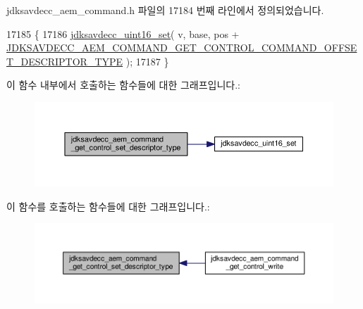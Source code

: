 jdksavdecc\+\_\+aem\+\_\+command.\+h 파일의 17184 번째 라인에서 정의되었습니다.


\begin{DoxyCode}
17185 \{
17186     \hyperlink{group__endian_ga14b9eeadc05f94334096c127c955a60b}{jdksavdecc\_uint16\_set}( v, base, pos + 
      \hyperlink{group__command__get__control_gab6f8d9ccbc87bb8a57077d41cd8fe7a2}{JDKSAVDECC\_AEM\_COMMAND\_GET\_CONTROL\_COMMAND\_OFFSET\_DESCRIPTOR\_TYPE}
       );
17187 \}
\end{DoxyCode}


이 함수 내부에서 호출하는 함수들에 대한 그래프입니다.\+:
\nopagebreak
\begin{figure}[H]
\begin{center}
\leavevmode
\includegraphics[width=350pt]{group__command__get__control_ga5b685187fafd639322cdee542dcd80d2_cgraph}
\end{center}
\end{figure}




이 함수를 호출하는 함수들에 대한 그래프입니다.\+:
\nopagebreak
\begin{figure}[H]
\begin{center}
\leavevmode
\includegraphics[width=350pt]{group__command__get__control_ga5b685187fafd639322cdee542dcd80d2_icgraph}
\end{center}
\end{figure}


